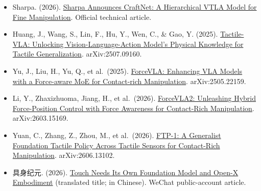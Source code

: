 \vspace{0.25em}
\begin{itemize}
\tightlist
\item
  Sharpa. (2026). \href{https://www.sharpa.com/blogs/news/sharpa-announces-craftnet-a-hierarchical-vtla-model-for-fine-manipulation}{Sharpa Announces CraftNet: A Hierarchical VTLA Model for Fine Manipulation}. Official technical article.
\item
  Huang, J., Wang, S., Lin, F., Hu, Y., Wen, C., \& Gao, Y. (2025). \href{https://arxiv.org/abs/2507.09160}{Tactile-VLA: Unlocking Vision-Language-Action Model's Physical Knowledge for Tactile Generalization}. arXiv:2507.09160.
\item
  Yu, J., Liu, H., Yu, Q., et al.~(2025). \href{https://arxiv.org/abs/2505.22159}{ForceVLA: Enhancing VLA Models with a Force-aware MoE for Contact-rich Manipulation}. arXiv:2505.22159.
\item
  Li, Y., Zhaxizhuoma, Jiang, H., et al.~(2026). \href{https://arxiv.org/abs/2603.15169}{ForceVLA2: Unleashing Hybrid Force-Position Control with Force Awareness for Contact-Rich Manipulation}. arXiv:2603.15169.
\item
  Yuan, C., Zhang, Z., Zhou, M., et al.~(2026). \href{https://arxiv.org/abs/2606.13102}{FTP-1: A Generalist Foundation Tactile Policy Across Tactile Sensors for Contact-Rich Manipulation}. arXiv:2606.13102.
\item
  具身纪元. (2026). \href{https://www.jintiankansha.com/t/DWG4NegaMt}{Touch Needs Its Own Foundation Model and Open-X Embodiment} (translated title; in Chinese). WeChat public-account article.
\end{itemize}

\clearpage
